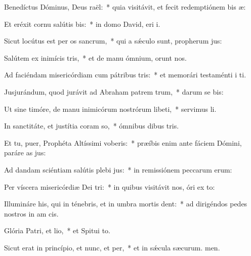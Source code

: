 \item Benedíctus Dóminus, Deus raël:~* quia visitávit, et fecit redemptiónem bis æ:
\item Et eréxit cornu salútis bis:~* in domo David, eri i.
\item Sicut locútus est per os sancrum,~* qui a sǽculo sunt, propherum jus:
\item Salútem ex inimícis tris,~* et de manu ómnium,  orunt nos.
\item Ad faciéndam misericórdiam cum pátribus tris:~* et memorári testaménti i ti.
\item Jusjurándum, quod jurávit ad Abraham patrem trum,~* darum se bis:
\item Ut sine timóre, de manu inimicórum nostrórum libeti,~* servimus li.
\item In sanctitáte, et justítia coram so,~* ómnibus dibus tris.
\item Et tu, puer, Prophéta Altíssimi voberis:~* præíbis enim ante fáciem Dómini, paráre as jus:
\item Ad dandam sciéntiam salútis plebi jus:~* in remissiónem peccarum erum:
\item Per víscera misericórdiæ Dei tri:~* in quibus visitávit nos, óri ex to:
\item Illumináre his, qui in ténebris, et in umbra mortis dent:~* ad dirigéndos pedes nostros in am cis.
\item Glória Patri, et lio,~* et Spitui to.
\item Sicut erat in princípio, et nunc, et per,~* et in sǽcula sæcurum. men.
